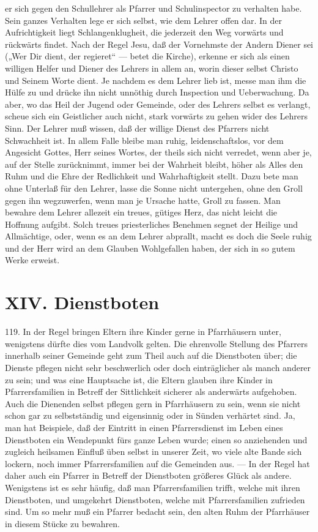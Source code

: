 er sich gegen den Schullehrer als Pfarrer und Schulinspector zu verhalten habe. Sein ganzes Verhalten lege er sich selbst, wie dem Lehrer offen dar. In der Aufrichtigkeit liegt Schlangenklugheit, die jederzeit den Weg vorwärts und rückwärts findet. Nach der Regel Jesu, daß der Vornehmste der Andern Diener sei („Wer Dir dient, der regieret“ — betet die Kirche), erkenne er sich als einen willigen Helfer und Diener des Lehrers in allem an, worin dieser selbst Christo und Seinem Worte dient. Je nachdem es dem Lehrer lieb ist, messe man ihm die Hülfe zu und drücke ihn nicht unnöthig durch Inspection und Ueberwachung. Da aber, wo das Heil der Jugend oder Gemeinde, oder des Lehrers selbst es verlangt, scheue sich ein Geistlicher auch nicht, stark vorwärts zu gehen wider des Lehrers Sinn. Der Lehrer muß wissen, daß der willige Dienst des Pfarrers nicht Schwachheit ist. In allem Falle bleibe man ruhig, leidenschaftslos, vor dem Angesicht Gottes, Herr seines Wortes, der theils sich nicht verredet, wenn aber je, auf der Stelle zurücknimmt, immer bei der Wahrheit bleibt, höher als Alles den Ruhm und die Ehre der Redlichkeit und Wahrhaftigkeit stellt. Dazu bete man ohne Unterlaß für den Lehrer, lasse die Sonne nicht untergehen, ohne den Groll gegen ihn wegzuwerfen, wenn man je Ursache hatte, Groll zu fassen. Man bewahre dem Lehrer allezeit ein treues, gütiges Herz, das nicht leicht die Hoffnung aufgibt. Solch treues priesterliches Benehmen segnet der Heilige und Allmächtige, oder, wenn es an dem Lehrer abprallt, macht es doch die Seele
ruhig und der Herr wird an dem Glauben Wohlgefallen haben, der sich in so gutem Werke erweist.

\section{XIV. Dienstboten}

119. In der Regel bringen Eltern ihre Kinder gerne in Pfarrhäusern unter, wenigstens dürfte dies vom Landvolk gelten. Die ehrenvolle Stellung des Pfarrers innerhalb seiner Gemeinde geht zum Theil auch auf die Dienstboten über; die Dienste pflegen nicht sehr beschwerlich oder doch einträglicher als manch anderer zu sein; und was eine Hauptsache ist, die Eltern glauben ihre Kinder in Pfarrersfamilien in Betreff der Sittlichkeit sicherer als anderwärts aufgehoben. Auch die Dienenden selbst pflegen gern in Pfarrhäusern zu sein, wenn sie nicht schon gar zu selbstständig und eigensinnig oder in Sünden verhärtet sind. Ja, man hat Beispiele, daß der Eintritt in einen Pfarrersdienst im Leben eines Dienstboten ein Wendepunkt fürs ganze Leben wurde; einen so anziehenden und zugleich heilsamen Einfluß üben selbst in unserer Zeit, wo viele alte Bande sich lockern, noch immer Pfarrersfamilien auf die Gemeinden aus. — In der Regel hat daher auch ein Pfarrer in Betreff der Dienstboten größeres Glück als andere. Wenigstens ist es sehr häufig, daß man Pfarrersfamilien trifft, welche mit ihren Dienstboten, und umgekehrt Dienstboten, welche mit Pfarrersfamilien zufrieden sind. Um so mehr muß ein Pfarrer bedacht sein, den alten Ruhm der Pfarrhäuser in diesem Stücke zu bewahren.

